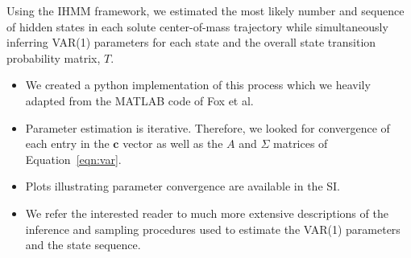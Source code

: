 \documentclass{article}
\begin{document}
  Using the IHMM framework, we estimated the most likely number and sequence of hidden
  states in each solute center-of-mass trajectory while simultaneously inferring VAR(1)
  parameters for each state and the overall state transition probability matrix, $T$.
  \begin{itemize}
    \item We created a python implementation of this process which we heavily adapted from
    the MATLAB code of Fox et al.~\cite{fox_sticky_2007} 
    \item Parameter estimation is iterative. Therefore, we looked for convergence 
    of each entry in the $\mathbf{c}$ vector as well as the $A$ and $\Sigma$ matrices of 
    Equation~\ref{eqn:var}.
    \item Plots illustrating parameter convergence are available in the SI.
    \item We refer the interested reader to much more extensive descriptions of 
    the inference and sampling procedures used to estimate the VAR(1) parameters
    and the state sequence. 
    ~\cite{beal_infinite_2002,teh_hierarchical_2006,van_gael_beam_2008,fox_nonparametric_2009,fox_bayesian_2010}
  \end{itemize}
  
\end{document}
